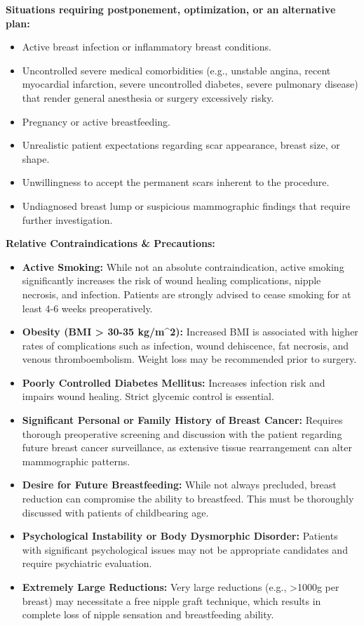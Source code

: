\textbf{Situations requiring postponement, optimization, or an alternative plan:}
\begin{itemize}
  \item Active breast infection or inflammatory breast conditions.
  \item Uncontrolled severe medical comorbidities (e.g., unstable angina, recent myocardial infarction, severe uncontrolled diabetes, severe pulmonary disease) that render general anesthesia or surgery excessively risky.
  \item Pregnancy or active breastfeeding.
  \item Unrealistic patient expectations regarding scar appearance, breast size, or shape.
  \item Unwillingness to accept the permanent scars inherent to the procedure.
  \item Undiagnosed breast lump or suspicious mammographic findings that require further investigation.
\end{itemize}

\textbf{Relative Contraindications \& Precautions:}
\begin{itemize}
  \item \textbf{Active Smoking:} While not an absolute contraindication, active smoking significantly increases the risk of wound healing complications, nipple necrosis, and infection. Patients are strongly advised to cease smoking for at least 4-6 weeks preoperatively.
  \item \textbf{Obesity (BMI > 30-35 kg/m\textasciicircum2):} Increased BMI is associated with higher rates of complications such as infection, wound dehiscence, fat necrosis, and venous thromboembolism. Weight loss may be recommended prior to surgery.
  \item \textbf{Poorly Controlled Diabetes Mellitus:} Increases infection risk and impairs wound healing. Strict glycemic control is essential.
  \item \textbf{Significant Personal or Family History of Breast Cancer:} Requires thorough preoperative screening and discussion with the patient regarding future breast cancer surveillance, as extensive tissue rearrangement can alter mammographic patterns.
  \item \textbf{Desire for Future Breastfeeding:} While not always precluded, breast reduction can compromise the ability to breastfeed. This must be thoroughly discussed with patients of childbearing age.
  \item \textbf{Psychological Instability or Body Dysmorphic Disorder:} Patients with significant psychological issues may not be appropriate candidates and require psychiatric evaluation.
  \item \textbf{Extremely Large Reductions:} Very large reductions (e.g., >1000g per breast) may necessitate a free nipple graft technique, which results in complete loss of nipple sensation and breastfeeding ability.
\end{itemize}

